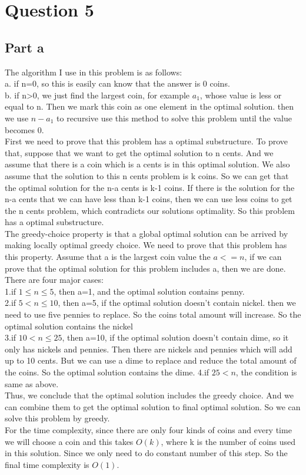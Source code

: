\documentclass[paper=a4, fontsize=11pt]{scrartcl} %
\numberwithin{equation}{section} %
\numberwithin{figure}{section} %
\numberwithin{table}{section} %
\begin{document}
\section{\textbf{Question 5}}
\subsection{\textbf{Part a}}
The algorithm I use in this problem is as follows:\\
a. if n=0, so this is easily can know that the answer is 0 coins.\\
b. if n>0, we just find the largest coin, for example $a_1$, whose value is less or equal to n. Then we mark this coin as one element in the optimal solution. then we use $n-a_1$ to recursive use this method to solve this problem until the value becomes 0.\\
First we need to prove that this problem has a optimal substructure. To prove that, suppose that we want to get the optimal solution to n cents. And we assume that there is a coin which is a cents is in this optimal solution. We also assume that the solution to this n cents problem is k coins. So we can get that the optimal solution for the n-a cents is k-1 coins. If there is the solution for the n-a cents that we can have less than k-1 coins, then we can use less coins to get the n cents problem, which contradicts our solutions optimality. So this problem has a optimal substructure. \\
The greedy-choice property is that a global optimal solution can be arrived by making locally optimal greedy choice. We need to prove that this problem has this property. Assume that a is the largest coin value the $a<=n$, if we can prove that the optimal solution for this problem includes a, then we are done. There are four major cases:\\
1.if $1\leq n\leq 5$, then a=1, and the optimal solution contains penny.\\
2.if $5<n\leq 10$, then a=5, if the optimal solution doesn't contain nickel. then we need to use five pennies to replace. So the coins total amount will increase. So the optimal solution contains the nickel\\
3.if $10<n\leq 25$, then a=10, if the optimal solution doesn't contain dime, so it only has nickels and pennies. Then there are nickels and pennies which will add up to 10 cents. But we can use a dime to replace and reduce the total amount of the coins. So the optimal solution contains the dime.
4.if $25<n$, the condition is same as above.\\
Thus, we conclude that the optimal solution includes the greedy choice. And we can combine them to get the optimal solution to final optimal solution. So we can solve this problem by greedy.\\
For the time complexity, since there are only four kinds of coins and every time we will choose a coin and this takes $O(k)$, where k is the number of coins used in this solution. Since we only need to do constant number of this step. So the final time complexity is $O(1)$.\\
\end{document}
